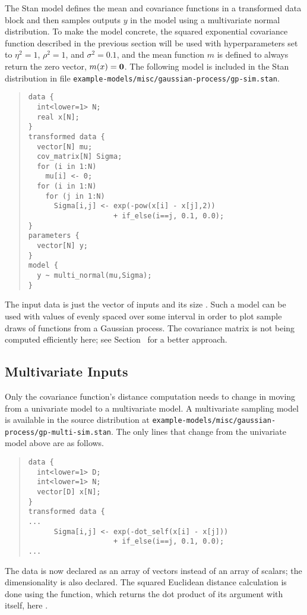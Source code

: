 The Stan model defines the mean and covariance functions in a
transformed data block and then samples outputs $y$ in the model using
a multivariate normal distribution.  To make the model concrete, the
squared exponential covariance function described in the previous section
will be used with hyperparameters set to $\eta^2 = 1$, $\rho^2 = 1$,
and $\sigma^2 = 0.1$, and the mean function $m$ is defined to always
return the zero vector, $m(x) = {\bf 0}$.  The following model is
included in the Stan distribution in file
\nolinkurl{example-models/misc/gaussian-process/gp-sim.stan}.
%
\begin{quote}
\begin{Verbatim}[fontsize=\small]
data {
  int<lower=1> N;
  real x[N];
}
transformed data {
  vector[N] mu;
  cov_matrix[N] Sigma;
  for (i in 1:N) 
    mu[i] <- 0;
  for (i in 1:N) 
    for (j in 1:N)
      Sigma[i,j] <- exp(-pow(x[i] - x[j],2)) 
                    + if_else(i==j, 0.1, 0.0);
}
parameters {
  vector[N] y;
}
model {
  y ~ multi_normal(mu,Sigma);
}
\end{Verbatim}
\end{quote}
%
The input data is just the vector of inputs  and its size
.  Such a model can be used with values of  evenly
spaced over some interval in order to plot sample draws of functions
from a Gaussian process.  The covariance matrix  is not
being computed efficiently here; see
Section~ for a better approach.

\subsection{Multivariate Inputs}

Only the covariance function's distance computation needs to change in
moving from a univariate model to a multivariate model.  A
multivariate sampling model is available in the source distribution at
\nolinkurl{example-models/misc/gaussian-process/gp-multi-sim.stan}.  The
only lines that change from the univariate model above are as follows.
%
\begin{quote}
\begin{Verbatim}[fontsize=\small]
data {
  int<lower=1> D;
  int<lower=1> N;
  vector[D] x[N];
}
transformed data {
...
      Sigma[i,j] <- exp(-dot_self(x[i] - x[j])) 
                    + if_else(i==j, 0.1, 0.0);
...
\end{Verbatim}
\end{quote}
%
The data is now declared as an array of vectors instead of an array of
scalars; the dimensionality  is also declared.  The squared
Euclidean distance calculation is done using the 
function, which returns the dot product of its argument with itself, here
.

